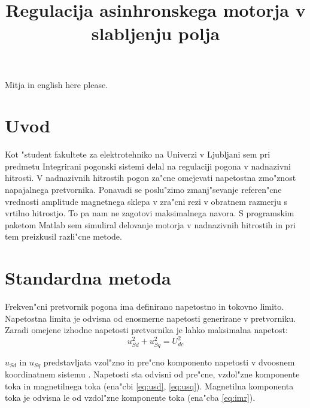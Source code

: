 \documentclass[journal,a4paper,twoside]{sty/IEEEtran}
\begin{document}
\title{Regulacija asinhronskega motorja v slabljenju polja}

\address{E-pošta: mitja1357@gmail.com}

\abstract{}



\maketitle

{Mitja in english here please.}

\section{Uvod}

Kot "student fakultete za elektrotehniko na Univerzi v Ljubljani sem pri predmetu Integrirani pogonski sistemi delal na regulaciji pogona v nadnazivni hitrosti. V nadnazivnih hitrostih pogon za"cne omejevati napetostna zmo"znost napajalnega pretvornika.  Ponavadi se poslu"zimo zmanj"sevanje referen"cne vrednosti amplitude magnetnega sklepa v zra"cni rezi v obratnem razmerju s vrtilno hitrostjo. To pa nam ne zagotovi maksimalnega navora. S programskim paketom Matlab sem simuliral delovanje motorja v nadnazivnih hitrostih in pri tem preizkusil razli"cne metode.

\section{Standardna metoda}
Frekven"cni pretvornik pogona ima definirano napetostno in tokovno limito. Napetostna limita je odvisna od enosmerne napetosti generirane v pretvorniku.
Zaradi omejene izhodne napetosti pretvornika je lahko maksimalna napetost:
\begin{equation}
u_{Sd}^2+u_{Sq}^2= U_{dc}^2
\label{eq:napetost1}
\end{equation}

$u_{Sd}$ in $u_{Sq}$ predstavljata vzol"zno in pre"cno komponento  napetosti v dvoosnem koordinatnem sistemu \cite{servopogoni}. Napetosti sta odvisni od pre"cne, vzdol"zne komponente toka in magnetilnega  toka (ena"cbi \ref{eq:usd}, \ref{eq:usq}). Magnetilna komponenta toka je odvisna le od vzdol"zne komponente toka (ena"cba \ref{eq:imr}).
\end{document}
